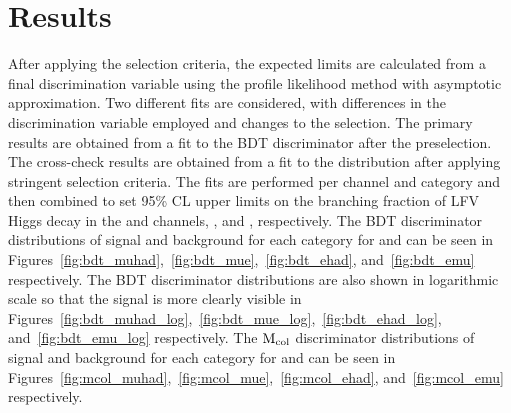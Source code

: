 %
%

\chapter{Results}
\label{results}

After applying the selection criteria, the expected limits are calculated from a final discrimination variable using the profile likelihood method with asymptotic approximation. Two different fits are considered, with differences in the discrimination variable employed and changes to the selection. The primary results are obtained from a fit to the BDT discriminator after the preselection. The cross-check results are obtained from a fit to the \mcol distribution after applying stringent selection criteria. The fits are performed per channel and category and then combined to set 95\% CL upper limits on the branching fraction of LFV Higgs decay in the \Hmt and \Het channels, \BHmt, and \BHet, respectively. The BDT discriminator distributions of signal and background for each category for \Hmt and \Het can be seen in Figures~\ref{fig:bdt_muhad},~\ref{fig:bdt_mue},~\ref{fig:bdt_ehad}, and~\ref{fig:bdt_emu} respectively. The BDT discriminator distributions are also shown in logarithmic scale so that the signal is more clearly visible in Figures~\ref{fig:bdt_muhad_log},~\ref{fig:bdt_mue_log},~\ref{fig:bdt_ehad_log}, and~\ref{fig:bdt_emu_log} respectively. The $\text{M}_{\text{col}}$ discriminator distributions of signal and background for each category for \Hmt and \Het can be seen in Figures~\ref{fig:mcol_muhad},~\ref{fig:mcol_mue},~\ref{fig:mcol_ehad}, and~\ref{fig:mcol_emu} respectively.

